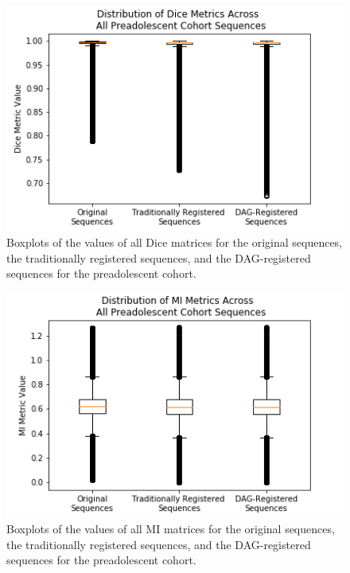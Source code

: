 \begin{figure}[t!]
\centering
\includegraphics[height=0.3\textheight]{6/figures/preads-dice-box.png}
\caption{Boxplots of the values of all Dice matrices for the original sequences, the traditionally registered sequences, and the DAG-registered sequences for the preadolescent cohort.}
\label{fig:preads-dice-box}
\end{figure}

\begin{figure}[t!]
\centering
\includegraphics[height=0.3\textheight]{6/figures/preads-mi-box.png}
\caption{Boxplots of the values of all MI matrices for the original sequences, the traditionally registered sequences, and the DAG-registered sequences for the preadolescent cohort.}
\label{fig:preads-mi-box}
\end{figure}

